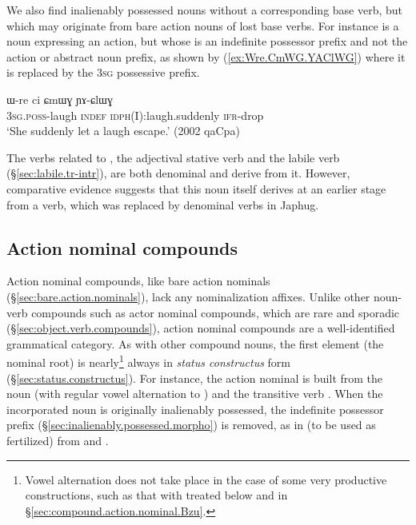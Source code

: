 We also find inalienably possessed nouns without a corresponding base verb, but which may originate from bare action nouns of lost base verbs. For instance  is a noun expressing an action, but whose  is an indefinite possessor prefix and not the action or abstract noun prefix, as shown by (\ref{ex:Wre.CmWG.YAClWG}) where it is replaced by the \textsc{3sg} possessive  prefix. 

\begin{exe}
\ex \label{ex:Wre.CmWG.YAClWG}
\gll  ɯ-re ci ɕmɯɣ ɲɤ-ɕlɯɣ \\
 \textsc{3sg}.\textsc{poss}-laugh \textsc{indef} \textsc{idph}(I):laugh.suddenly \textsc{ifr}-drop \\
\glt  `She suddenly let a laugh escape.' (2002 qaCpa)
\end{exe}

The verbs related to  , the adjectival stative verb  and the labile verb  (§\ref{sec:labile.tr-intr}), are both denominal and derive from it. However, comparative evidence suggests that this noun itself derives at an earlier stage from a verb, which was replaced by denominal verbs in Japhug.


\subsection{Action nominal compounds} \label{sec:action.nominal.compounds}
Action nominal compounds, like bare action nominals (§\ref{sec:bare.action.nominals}), lack any nominalization affixes. Unlike other noun-verb compounds such as actor nominal compounds, which are rare and sporadic (§\ref{sec:object.verb.compounds}), action nominal compounds are a well-identified grammatical category. As with other compound nouns, the first element (the nominal root) is nearly\footnote{Vowel alternation does not take place in the case of some very productive constructions, such as that with  treated below and in §\ref{sec:compound.action.nominal.Bzu}.} always in \textit{status constructus} form (§\ref{sec:status.constructus}). For instance, the action nominal  is built from the noun  (with regular vowel alternation to ) and the transitive verb .  When the incorporated noun is originally inalienably possessed, the indefinite possessor prefix (§\ref{sec:inalienably.possessed.morpho}) is removed, as in  (to be used as fertilized) from  and .
 
